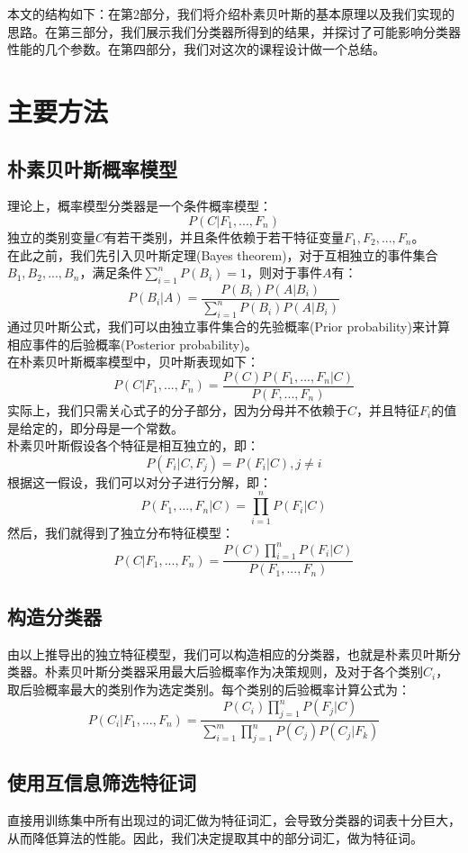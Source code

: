 \documentclass[a4paper, twocolumn, 12pt]{article}
\begin{document}
本文的结构如下：在第2部分，我们将介绍朴素贝叶斯的基本原理以及我们实现的思路。在第三部分，我们展示我们分类器所得到的结果，并探讨了可能影响分类器性能的几个参数。在第四部分，我们对这次的课程设计做一个总结。

\section{主要方法}
\subsection{朴素贝叶斯概率模型}
理论上，概率模型分类器是一个条件概率模型：
\[ P(C|F_1, ..., F_n) \]
独立的类别变量$C$有若干类别，并且条件依赖于若干特征变量$F_1, F_2, ..., F_n$。\\

在此之前，我们先引入贝叶斯定理(Bayes theorem)，对于互相独立的事件集合${B_1, B_2, ..., B_n}$，满足条件$\sum_{i=1}^n P(B_i)=1$，则对于事件$A$有：
\[P(B_i|A)=\frac{P(B_i)P(A|B_i)}{\sum_{i=1}^n P(B_i)P(A|B_i)}\]
通过贝叶斯公式，我们可以由独立事件集合的先验概率(Prior probability)来计算相应事件的后验概率(Posterior probability)。\\

在朴素贝叶斯概率模型中，贝叶斯表现如下：
\[P(C|F_1, ..., F_n)=\frac{P(C)P(F_1, ..., F_n|C)}{P(F, ..., F_n)}\]
实际上，我们只需关心式子的分子部分，因为分母并不依赖于$C$，并且特征$F_i$的值是给定的，即分母是一个常数。\\

朴素贝叶斯假设各个特征是相互独立的，即：
\[P(F_i|C, F_j)=P(F_i|C), j \neq i\]
根据这一假设，我们可以对分子进行分解，即：
\[P(F_1, ..., F_n|C)=\prod_{i=1}^nP(F_i|C)\]
然后，我们就得到了独立分布特征模型：
\[P(C|F_1, ..., F_n)=\frac{P(C)\prod_{i=1}^n P(F_i|C)}{P(F_1, ..., F_n)}\]
\subsection{构造分类器}
由以上推导出的独立特征模型，我们可以构造相应的分类器，也就是朴素贝叶斯分类器。朴素贝叶斯分类器采用最大后验概率作为决策规则，及对于各个类别$C_i$，取后验概率最大的类别作为选定类别。每个类别的后验概率计算公式为：
\[P(C_i|F_1, ..., F_n)=\frac{P(C_i)\prod_{j=1}^nP(F_j|C)}{\sum_{i=1}^m \prod_{j=1}^nP(C_j)P(C_j|F_k)}\]

\subsection{使用互信息筛选特征词}
直接用训练集中所有出现过的词汇做为特征词汇，会导致分类器的词表十分巨大，从而降低算法的性能。因此，我们决定提取其中的部分词汇，做为特征词。\\
\end{document}
